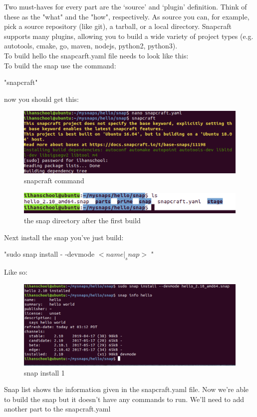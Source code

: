 \documentclass{article}
\begin{document}
\begin{flushleft}
\begin{flushleft}
\bigskip%
Two must-haves for every part are the ‘source' and ‘plugin' definition. Think of these as the
"what" and the "how", respectively. As source you can, for example, pick a source repository (like
git), a tarball, or a local directory. Snapcraft supports many plugins, allowing you to build
a wide variety of project types (e.g. autotools, cmake, go, maven, nodejs, python2, python3).\\
To build hello the snapcarft.yaml file needs to look like this: \pageref{fig:step5}\\
\bigskip 
To build the snap use the command: \\
		\begin{center}	
			"snapcraft"\\ 
			\end{center}
now you should get this:
\label{fig:step4}
	\begin{figure}[H]
	\includegraphics[width=5in]{step4.png}
	\caption[Optional caption]{snapcraft command}
	\end{figure}
	 
\label{fig:step6}	
	\begin{figure}[H]
	\includegraphics[width=5in]{step6.png}
	\caption[Optional caption]{the snap directory after the first build}
	\end{figure}
\cleardoublepage
Next install the snap you've just build: 
			\begin{center}	
		"sudo snap install - -devmode $<name|_snap>$ \pageref{fig:step6}" 
			\end{center}
Like so:
	\label{fig:step7}
	\begin{figure}[H]
	\includegraphics[width=5in]{step7.png}
	\caption[Optional caption]{snap install 1}
	\end{figure}
Snap list shows the information given in the snapcraft.yaml file.
Now we're able to build the snap but it doesn't have any commands to run. We'll need to add another part to the snapcraft.yaml\\
\cleardoublepage 


\end{flushleft}
\end{flushleft}
\end{document}
